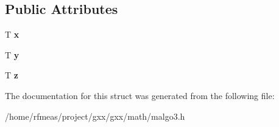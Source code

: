 \subsection*{Public Attributes}
\begin{DoxyCompactItemize}
\item 
T {\bfseries x}\hypertarget{structmalgo_1_1vector3_a27e600f4acbd8e10b6309ac6be98c8db}{}\label{structmalgo_1_1vector3_a27e600f4acbd8e10b6309ac6be98c8db}

\item 
T {\bfseries y}\hypertarget{structmalgo_1_1vector3_a5362fae85605cc556824dd3aa03a3f03}{}\label{structmalgo_1_1vector3_a5362fae85605cc556824dd3aa03a3f03}

\item 
T {\bfseries z}\hypertarget{structmalgo_1_1vector3_a18a847ab18a32db164835805d4d6f5ff}{}\label{structmalgo_1_1vector3_a18a847ab18a32db164835805d4d6f5ff}

\end{DoxyCompactItemize}


The documentation for this struct was generated from the following file\+:\begin{DoxyCompactItemize}
\item 
/home/rfmeas/project/gxx/gxx/math/malgo3.\+h\end{DoxyCompactItemize}
